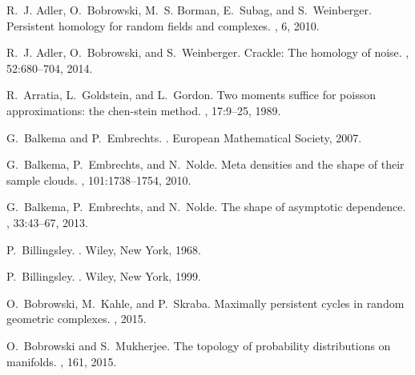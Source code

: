 \documentclass[11pt]{amsart}
\numberwithin{equation}{section}
\theoremstyle{plain}
\theoremstyle{definition}
\begin{document}
\begin{thebibliography}{10}

R.~J. Adler, O.~Bobrowski, M.~S. Borman, E.~Subag, and S.~Weinberger.
\newblock Persistent homology for random fields and complexes.
, 6, 2010.

R.~J. Adler, O.~Bobrowski, and S.~Weinberger.
\newblock Crackle: The homology of noise.
, 52:680--704, 2014.

R.~Arratia, L.~Goldstein, and L.~Gordon.
\newblock Two moments suffice for poisson approximations: the chen-stein
  method.
, 17:9--25, 1989.

G.~Balkema and P.~Embrechts.
.
\newblock European Mathematical Society, 2007.

G.~Balkema, P.~Embrechts, and N.~Nolde.
\newblock Meta densities and the shape of their sample clouds.
, 101:1738--1754, 2010.

G.~Balkema, P.~Embrechts, and N.~Nolde.
\newblock The shape of asymptotic dependence.
, 33:43--67, 2013.

P.~Billingsley.
.
\newblock Wiley, New York, 1968.

P.~Billingsley.
.
\newblock Wiley, New York, 1999.

O.~Bobrowski, M.~Kahle, and P.~Skraba.
\newblock Maximally persistent cycles in random geometric complexes.
, 2015.

O.~Bobrowski and S.~Mukherjee.
\newblock The topology of probability distributions on manifolds.
, 161, 2015.


\end{thebibliography}
\end{document}
